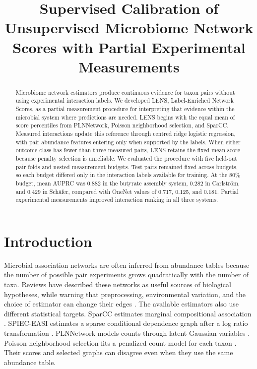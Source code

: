 \documentclass[11pt]{article}
\title{Supervised Calibration of Unsupervised Microbiome Network Scores with Partial Experimental Measurements}
\date{}
\begin{document}
\maketitle

\begin{abstract}
Microbiome network estimators produce continuous evidence for taxon pairs without using experimental interaction labels.
We developed LENS, Label-Enriched Network Scores, as a partial measurement procedure for interpreting that evidence within the microbial system where predictions are needed.
LENS begins with the equal mean of score percentiles from PLNNetwork, Poisson neighborhood selection, and SparCC.
Measured interactions update this reference through centred ridge logistic regression, with pair abundance features entering only when supported by the labels.
When either outcome class has fewer than three measured pairs, LENS retains the fixed mean score because penalty selection is unreliable.
We evaluated the procedure with five held-out pair folds and nested measurement budgets.
Test pairs remained fixed across budgets, so each budget differed only in the interaction labels available for training.
At the 80\% budget, mean AUPRC was 0.882 in the butyrate assembly system, 0.282 in Carlstr\"om, and 0.429 in Sch\"afer, compared with OneNet values of 0.717, 0.125, and 0.181.
Partial experimental measurements improved interaction ranking in all three systems.
\end{abstract}

\section{Introduction}

Microbial association networks are often inferred from abundance tables because the number of possible pair experiments grows quadratically with the number of taxa.
Reviews have described these networks as useful sources of biological hypotheses, while warning that preprocessing, environmental variation, and the choice of estimator can change their edges \citep{faust2012networks,rottjers2018hairballs,matchado2021network}.
The available estimators also use different statistical targets.
SparCC estimates marginal compositional association \citep{friedman2012sparcc}.
SPIEC-EASI estimates a sparse conditional dependence graph after a log ratio transformation \citep{kurtz2015spieceasi}.
PLNNetwork models counts through latent Gaussian variables \citep{chiquet2019pln}.
Poisson neighborhood selection fits a penalized count model for each taxon \citep{allen2013poisson,friedman2010glmnet}.
Their scores and selected graphs can disagree even when they use the same abundance table.
\end{document}
